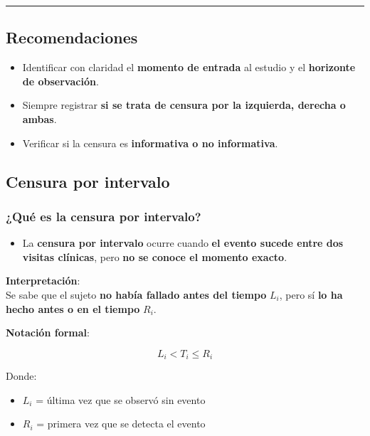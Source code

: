 \documentclass[
  letterpaper,
  DIV=11,
  numbers=noendperiod]{scrartcl}
\providecommand{\tightlist}{%
  \setlength{\itemsep}{0pt}\setlength{\parskip}{0pt}}
\begin{document}
\begin{center}\rule{0.5\linewidth}{0.5pt}\end{center}

\subsection{Recomendaciones}\label{recomendaciones}

\begin{itemize}
\tightlist
\item
  Identificar con claridad el \textbf{momento de entrada} al estudio y
  el \textbf{horizonte de observación}.
\item
  Siempre registrar \textbf{si se trata de censura por la izquierda,
  derecha o ambas}.
\item
  Verificar si la censura es \textbf{informativa o no informativa}.
\end{itemize}

\subsection{Censura por intervalo}\label{censura-por-intervalo}

\subsubsection{¿Qué es la censura por
intervalo?}\label{quuxe9-es-la-censura-por-intervalo}

\begin{itemize}
\tightlist
\item
  La \textbf{censura por intervalo} ocurre cuando \textbf{el evento
  sucede entre dos visitas clínicas}, pero \textbf{no se conoce el
  momento exacto}.
\end{itemize}

\textbf{Interpretación}:\\
Se sabe que el sujeto \textbf{no había fallado antes del tiempo}
\(L_i\), pero sí \textbf{lo ha hecho antes o en el tiempo} \(R_i\).

\textbf{Notación formal}:

\[
L_i < T_i \le R_i
\]

Donde:

\begin{itemize}
\tightlist
\item
  \(L_i\) = última vez que se observó sin evento\\
\item
  \(R_i\) = primera vez que se detecta el evento
\end{itemize}
\end{document}
